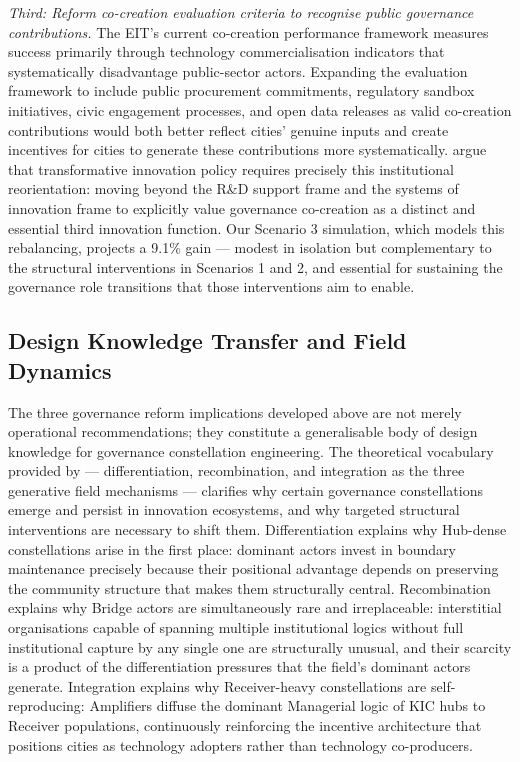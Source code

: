 \documentclass[review,12pt]{elsarticle}
\begin{document}
\textit{Third: Reform co-creation evaluation criteria to recognise public governance contributions.} The EIT's current co-creation performance framework measures success primarily through technology commercialisation indicators that systematically disadvantage public-sector actors. Expanding the evaluation framework to include public procurement commitments, regulatory sandbox initiatives, civic engagement processes, and open data releases as valid co-creation contributions would both better reflect cities' genuine inputs and create incentives for cities to generate these contributions more systematically. \citet{schot2018three} argue that transformative innovation policy requires precisely this institutional reorientation: moving beyond the R\&D support frame and the systems of innovation frame to explicitly value governance co-creation as a distinct and essential third innovation function. Our Scenario 3 simulation, which models this rebalancing, projects a 9.1\% gain --- modest in isolation but complementary to the structural interventions in Scenarios 1 and 2, and essential for sustaining the governance role transitions that those interventions aim to enable.

\subsection{Design Knowledge Transfer and Field Dynamics}

The three governance reform implications developed above are not merely operational recommendations; they constitute a generalisable body of design knowledge for governance constellation engineering. The theoretical vocabulary provided by \citet{korff2015social} --- differentiation, recombination, and integration as the three generative field mechanisms --- clarifies why certain governance constellations emerge and persist in innovation ecosystems, and why targeted structural interventions are necessary to shift them. Differentiation explains why Hub-dense constellations arise in the first place: dominant actors invest in boundary maintenance precisely because their positional advantage depends on preserving the community structure that makes them structurally central. Recombination explains why Bridge actors are simultaneously rare and irreplaceable: interstitial organisations capable of spanning multiple institutional logics without full institutional capture by any single one are structurally unusual, and their scarcity is a product of the differentiation pressures that the field's dominant actors generate. Integration explains why Receiver-heavy constellations are self-reproducing: Amplifiers diffuse the dominant Managerial logic of KIC hubs to Receiver populations, continuously reinforcing the incentive architecture that positions cities as technology adopters rather than technology co-producers.
\end{document}
